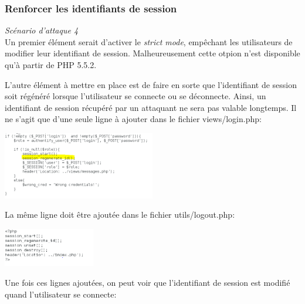 \documentclass{article}
\begin{document}
\subsubsection{Renforcer les identifiants de session}

\textit{Scénario d'attaque 4}\\

Un premier élément serait d'activer le \emph{strict mode}, empêchant les
utilisateurs de modifier leur identifiant de session. Malheureusement
cette otpion n'est disponible qu'à partir de PHP 5.5.2.

L'autre élément à mettre en place est de faire en sorte que
l'identifiant de session soit régénéré lorsque l'utilisateur se connecte
ou se déconnecte. Ainsi, un identifiant de session récupéré par un
attaquant ne sera pas valable longtemps. Il ne s'agit que d'une seule
ligne à ajouter dans le fichier views/login.php:\\

\begin{center}\includegraphics[width=0.5\textwidth]{images/session_code.PNG}\end{center}

La même ligne doit être ajoutée dans le fichier utils/logout.php:

\begin{center}\includegraphics[width=0.3\textwidth]{images/session_logout.PNG}\end{center}

Une fois ces lignes ajoutées, on peut voir que l'identifiant de session
est modifié quand l'utilisateur se connecte:
\end{document}
